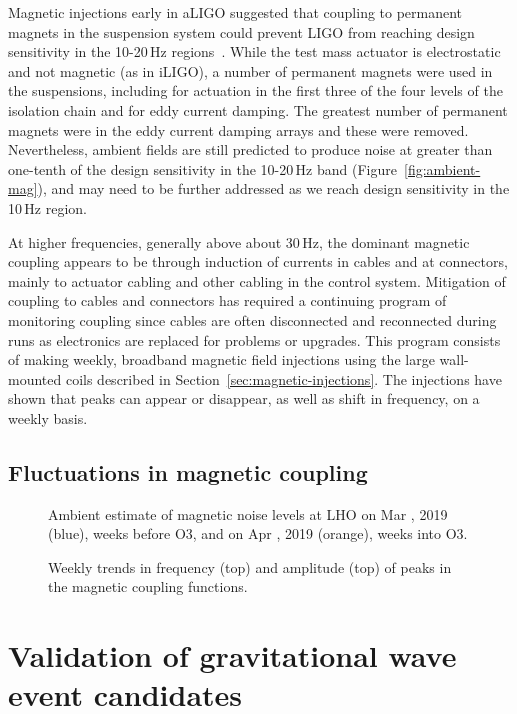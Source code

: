 Magnetic injections early in \ac{aLIGO} suggested that coupling to permanent magnets in the suspension system  could prevent \ac{LIGO} from reaching design sensitivity in the 10-20\,Hz regions~\citep{Schofield_2013}.
While the test mass actuator is electrostatic and not magnetic (as in \ac{iLIGO}), a number of permanent magnets were used in the suspensions, including for actuation in the first three of the four levels of the isolation chain and for eddy current damping.
The greatest number of permanent magnets were in the eddy current damping arrays and these were removed.
Nevertheless, ambient fields are still predicted to produce noise at greater than one-tenth of the design sensitivity in the 10-20\,Hz band (Figure~\ref{fig:ambient-mag}), and may need to be further addressed as we reach design sensitivity in the 10\,Hz region.

At higher frequencies, generally above about 30\,Hz, the dominant magnetic coupling appears to be through induction of currents in cables and at connectors, mainly to actuator cabling and other cabling in the control system.
Mitigation of coupling to cables and connectors has required a continuing program of monitoring coupling since cables are often disconnected and reconnected during runs as electronics are replaced for problems or upgrades.
This program consists of making weekly, broadband magnetic field injections using the large wall-mounted coils described in Section~\ref{sec:magnetic-injections}.
The injections have shown that peaks can appear or disappear, as well as shift in frequency, on a weekly basis.

\subsection{Fluctuations in magnetic coupling}

\begin{figure}
	\centering
	\caption{
		Ambient estimate of magnetic noise levels at LHO on Mar \XX, 2019 (blue), \XX weeks before O3, and on Apr \XX, 2019 (orange), \XX weeks into O3.}
	\label{fig:weekly-mag-preO3}
\end{figure}

\begin{figure}
	\centering
	\caption{Weekly trends in frequency (top) and amplitude (top) of peaks in the magnetic coupling functions.}
	\label{fig:weekly-mag-variation}
\end{figure}

\section{Validation of gravitational wave event candidates}\label{subsec:vetting}

